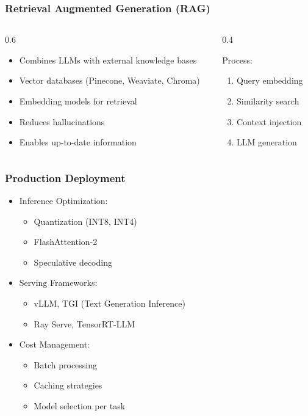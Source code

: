 \begin{frame}[fragile]\frametitle{Retrieval Augmented Generation (RAG)}
\begin{columns}
    \begin{column}[T]{0.6\linewidth}
        \begin{itemize}
            \item Combines LLMs with external knowledge bases
            \item Vector databases (Pinecone, Weaviate, Chroma)
            \item Embedding models for retrieval
            \item Reduces hallucinations
            \item Enables up-to-date information
        \end{itemize}
    \end{column}
    \begin{column}[T]{0.4\linewidth}
        
        Process:
        \begin{enumerate}
            \item Query embedding
            \item Similarity search
            \item Context injection
            \item LLM generation
        \end{enumerate}
    \end{column}
\end{columns}
\end{frame}

\begin{frame}[fragile]\frametitle{Production Deployment}
\begin{itemize}
    \item Inference Optimization:
        \begin{itemize}
            \item Quantization (INT8, INT4)
            \item FlashAttention-2
            \item Speculative decoding
        \end{itemize}
    \item Serving Frameworks:
        \begin{itemize}
            \item vLLM, TGI (Text Generation Inference)
            \item Ray Serve, TensorRT-LLM
        \end{itemize}
    \item Cost Management:
        \begin{itemize}
            \item Batch processing
            \item Caching strategies
            \item Model selection per task
        \end{itemize}
\end{itemize}
\end{frame}
